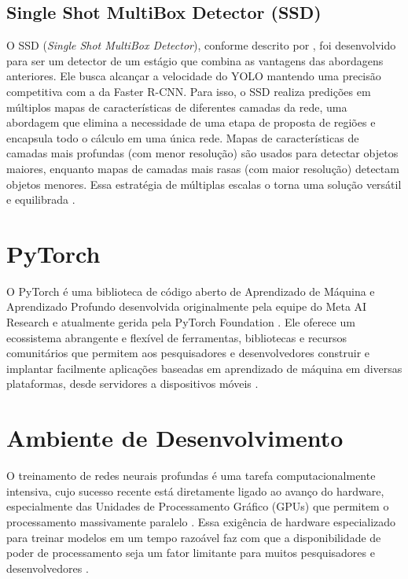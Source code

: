 \subsection{Single Shot MultiBox Detector (SSD)}

O SSD (\textit{Single Shot MultiBox Detector}), conforme descrito por
, foi desenvolvido para ser um detector de um estágio que combina as
vantagens das abordagens anteriores. Ele busca alcançar a velocidade do YOLO mantendo uma
precisão competitiva com a da Faster R-CNN. Para isso, o SSD realiza predições em múltiplos
mapas de características de diferentes camadas da rede, uma abordagem que elimina a
necessidade de uma etapa de proposta de regiões e encapsula todo o cálculo em uma única
rede. Mapas de características de camadas
mais profundas (com menor resolução) são usados para detectar objetos maiores, enquanto mapas
de camadas mais rasas (com maior resolução) detectam objetos menores. Essa estratégia de
múltiplas escalas o torna uma solução versátil e equilibrada \cite{liu2016ssd}.

\section{PyTorch}

O PyTorch é uma biblioteca de código aberto de Aprendizado de Máquina e Aprendizado Profundo
desenvolvida originalmente pela equipe do Meta AI Research \cite{paszke2019pytorch} e
atualmente gerida pela PyTorch Foundation \cite{pytorch2026}. Ele oferece um ecossistema
abrangente e flexível de ferramentas, bibliotecas e recursos comunitários que permitem aos
pesquisadores e desenvolvedores construir e implantar facilmente aplicações baseadas em
aprendizado de máquina em diversas plataformas, desde servidores a dispositivos móveis
\cite{pytorch2026}.

\section{Ambiente de Desenvolvimento}

O treinamento de redes neurais profundas é uma tarefa computacionalmente intensiva, cujo
sucesso recente está diretamente ligado ao avanço do hardware, especialmente das Unidades de
Processamento Gráfico (GPUs) que permitem o processamento massivamente paralelo
\cite{lecun2015deep}. Essa exigência de hardware especializado para treinar modelos em um tempo
razoável faz com que a disponibilidade de poder de processamento seja um fator limitante para
muitos pesquisadores e desenvolvedores \cite{goodfellow2016deep}.

